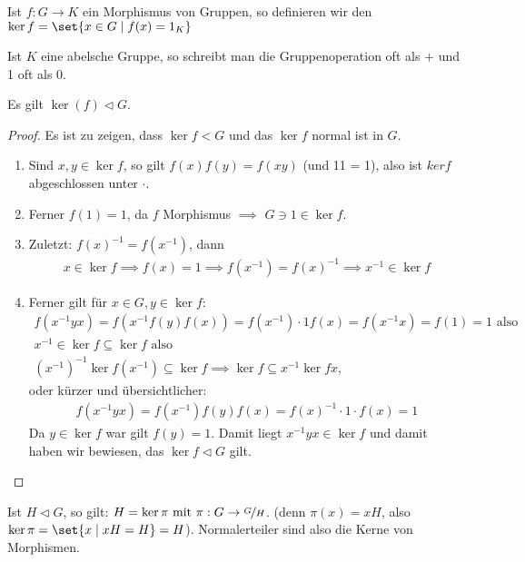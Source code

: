 \begin{definition}
	Ist $f: G \to K$ ein Morphismus von Gruppen, so definieren wir den  $\ker f = \set{x \in G \mid f(x) = 1_K}$
\end{definition}
\begin{*remark}
	Ist $K$ eine abelsche Gruppe, so schreibt man die Gruppenoperation oft als $+$ und 1 oft als 0.
\end{*remark}
\begin{proposition}
	Es gilt $\ker(f) \lhd G$.
\end{proposition}
\begin{proof} %
	Es ist zu zeigen, dass $\ker f < G$ und das $\ker f$ normal ist in $G$.
	\begin{enumerate}
		\item Sind $x,y \in \ker f$, so gilt $f(x)f(y) = f(xy)$ (und 11 = 1), also ist $ker f$ abgeschlossen unter $\cdot$.
		\item Ferner $f(1) = 1$, da $f$ Morphismus $\implies$ $G \ni 1 \in \ker f$.
		\item 	Zuletzt: $f(x)^{-1} = f(x^{-1})$, dann
		\begin{align*}
		x \in \ker f \implies f(x) = 1 \implies f(x^{-1}) = f(x)^{-1} \implies x^{-1} \in \ker f
		\end{align*}
		\item Ferner gilt für $x \in G, y \in \ker f$:
		\begin{align*}
		f(x^{-1}yx) = f(x^{-1}f(y)f(x)) = f(x^{-1})\cdot 1 f(x) = f(x^{-1}x) = f(1) = 1 \text{ also}\\
		x^{-1} \in \ker f \subseteq \ker f \text{ also }\\
		(x^{-1})^{-1} \ker f (x^{-1}) \subseteq \ker f \implies \ker f \subseteq x^{-1} \ker f x,
		\end{align*}
		oder kürzer und übersichtlicher:
		\begin{align*}
		f(x^{-1}yx) = f(x^{-1})f(y)f(x) = f(x)^{-1}\cdot 1 \cdot f(x) = 1
		\end{align*}
		Da $y \in \ker f$ war gilt $f(y) = 1$. Damit liegt $x^{-1}yx \in \ker f$ und damit haben wir bewiesen, das $\ker f \lhd G$ gilt.
	\end{enumerate}
\end{proof}
\begin{*remark}
	Ist $H \lhd G$, so gilt: $H = \ker \pi \mit \pi: G \to \lnkset{G}{H}$. (denn $\pi(x) = xH$, also $\ker \pi = \set{x \mid xH = H} = H$). Normalerteiler sind also die Kerne von Morphismen.
\end{*remark}
